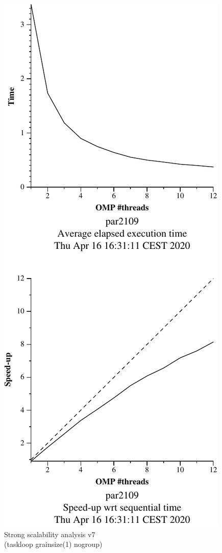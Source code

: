 \begin{figure}[H]
    \begin{minipage}{0.5\textwidth}
        \centering
        \includegraphics[width=0.7\linewidth]{plots/v7-crop.pdf}
        \caption{Strong scalability analysis v7 \\ (taskloop grainsize(1) nogroup)}
        \label{fig:ssa_v7} 
    \end{minipage}
    \begin{minipage}{0.5\textwidth}
        \centering

\end{minipage}
\end{figure}

